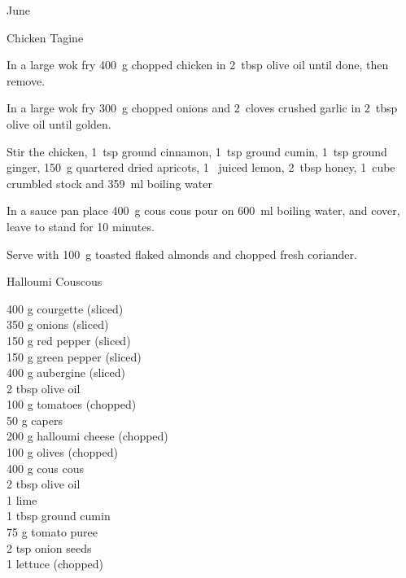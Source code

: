 \begin{menu}{June}
\begin{recipe}{2}{Chicken Tagine}
    \begin{instructions}
    \item 
        In a large wok fry
        400~g chopped chicken
        in
        2~tbsp  olive oil
        until done, then remove.
      \item 
        In a large wok fry
        300~g chopped onions
        and
        2~cloves crushed garlic
        in
        2~tbsp  olive oil
        until golden.
      \item 
        Stir the chicken,
        1~tsp  ground cinnamon,
        1~tsp  ground cumin,
        1~tsp  ground ginger,
        150~g quartered dried apricots,
        1~ juiced lemon,
        2~tbsp  honey,
        1~cube crumbled stock
        and
        359~ml  boiling water\item 
      In a
      sauce pan 
      place
      400~g  cous cous
      pour on
      600~ml  boiling water,
      and cover, leave to stand for 10 minutes.
    \item 
        Serve with
        100~g toasted flaked almonds
        and
         chopped fresh coriander.
      
    \end{instructions}
    \end{recipe}%
  
    \begin{recipe}{2}{Halloumi Couscous}%
		\begin{ingredients}
		400 g courgette (sliced) \\
	350 g onions (sliced) \\
	150 g red pepper (sliced) \\
	150 g green pepper (sliced) \\
	400 g aubergine (sliced) \\
	2 tbsp olive oil  \\
	100 g tomatoes (chopped) \\
	50 g capers  \\
	200 g halloumi cheese (chopped) \\
	100 g olives (chopped) \\
	400 g cous cous  \\
	2 tbsp olive oil  \\
	1  lime  \\
	1 tbsp ground cumin  \\
	75 g tomato puree  \\
	2 tsp onion seeds  \\
	1  lettuce (chopped) \\
	

\end{ingredients}
\end{recipe}
\end{menu}
